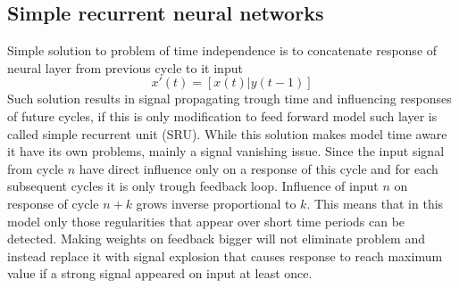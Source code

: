 \subsection{Simple recurrent neural networks}
Simple solution to problem of time independence is to concatenate response of neural layer
from previous cycle to it input 
\begin{equation}
	\label{equ:sru_input}
	x'(t)=[x(t)|y(t-1)]
\end{equation}
Such solution results in signal propagating trough time and influencing responses of future cycles,
if this is only modification to feed forward model such layer is called simple recurrent
unit (SRU).
While this solution makes model time aware it have its own problems, mainly a signal vanishing
issue. Since the input signal from cycle $n$ have direct influence only on a response of this
cycle and for each subsequent cycles it is only trough feedback loop. Influence of input $n$ on
response of cycle $n+k$ grows inverse proportional to $k$.
This means that in this model only those regularities that appear over short time periods can
be detected.
Making weights on feedback bigger will not eliminate problem and instead replace it with signal
explosion that causes response to reach maximum value if a strong signal appeared on input at
least once.


